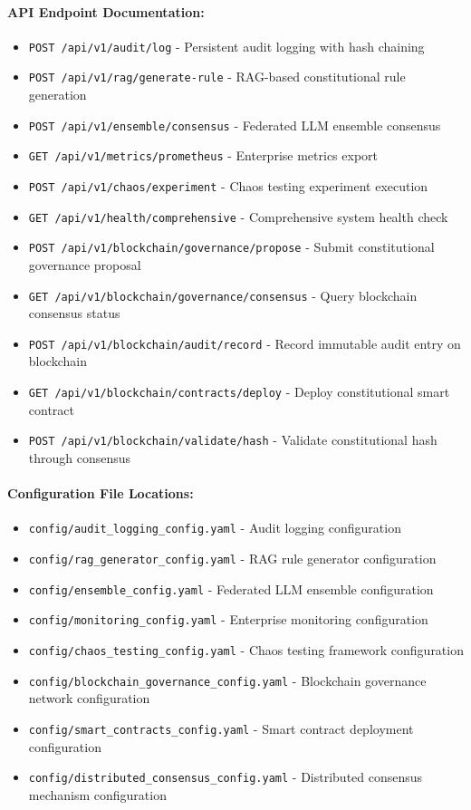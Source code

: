 \documentclass[manuscript,screen,9pt]{acmart}
\begin{document}
\paragraph{API Endpoint Documentation:}
\begin{itemize}[itemsep=1pt,parsep=1pt]
    \item \texttt{POST /api/v1/audit/log} - Persistent audit logging with hash chaining
    \item \texttt{POST /api/v1/rag/generate-rule} - RAG-based constitutional rule generation
    \item \texttt{POST /api/v1/ensemble/consensus} - Federated LLM ensemble consensus
    \item \texttt{GET /api/v1/metrics/prometheus} - Enterprise metrics export
    \item \texttt{POST /api/v1/chaos/experiment} - Chaos testing experiment execution
    \item \texttt{GET /api/v1/health/comprehensive} - Comprehensive system health check
    \item \texttt{POST /api/v1/blockchain/governance/propose} - Submit constitutional governance proposal
    \item \texttt{GET /api/v1/blockchain/governance/consensus} - Query blockchain consensus status
    \item \texttt{POST /api/v1/blockchain/audit/record} - Record immutable audit entry on blockchain
    \item \texttt{GET /api/v1/blockchain/contracts/deploy} - Deploy constitutional smart contract
    \item \texttt{POST /api/v1/blockchain/validate/hash} - Validate constitutional hash through consensus
\end{itemize}

\paragraph{Configuration File Locations:}
\begin{itemize}[itemsep=1pt,parsep=1pt]
    \item \texttt{config/audit\_logging\_config.yaml} - Audit logging configuration
    \item \texttt{config/rag\_generator\_config.yaml} - RAG rule generator configuration
    \item \texttt{config/ensemble\_config.yaml} - Federated LLM ensemble configuration
    \item \texttt{config/monitoring\_config.yaml} - Enterprise monitoring configuration
    \item \texttt{config/chaos\_testing\_config.yaml} - Chaos testing framework configuration
    \item \texttt{config/blockchain\_governance\_config.yaml} - Blockchain governance network configuration
    \item \texttt{config/smart\_contracts\_config.yaml} - Smart contract deployment configuration
    \item \texttt{config/distributed\_consensus\_config.yaml} - Distributed consensus mechanism configuration
\end{itemize}
\end{document}
